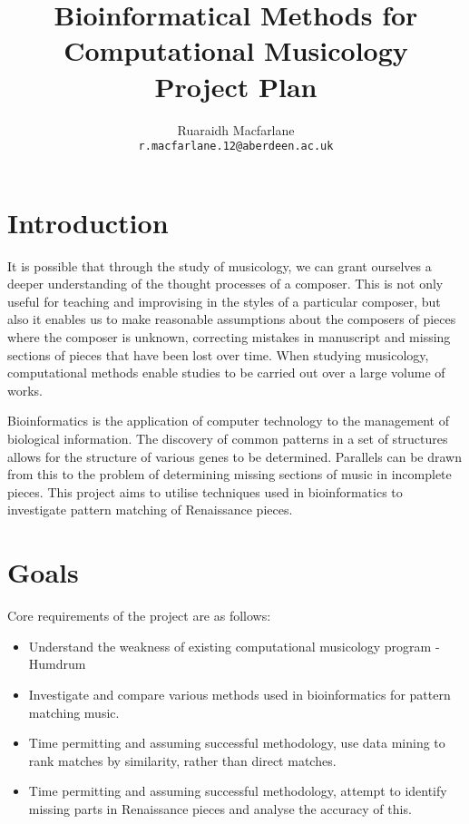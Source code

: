 \documentclass[a4paper,12pt]{article}
\begin{document}
\title{Bioinformatical Methods for Computational Musicology\\ Project Plan}
\author{Ruaraidh Macfarlane \\ \texttt{r.macfarlane.12@aberdeen.ac.uk}}
\maketitle

  \section{Introduction}
    It is possible that through the study of musicology, we can grant ourselves a deeper understanding of the thought processes of a composer. This is not only useful for teaching and improvising in the styles of a particular composer, but also it enables us to make reasonable assumptions about the composers of pieces where the composer is unknown, correcting mistakes in manuscript and missing sections of pieces that have been lost over time.  When studying musicology, computational methods enable studies to be carried out over a large volume of works.
  
    Bioinformatics is the application of computer technology to the management of biological information.  The discovery of common patterns in a set of structures allows for the structure of various genes to be determined. \cite{eidhammer2000structure} Parallels can be drawn from this to the problem of determining missing sections of music in incomplete pieces.  This project aims to utilise techniques used in bioinformatics to investigate pattern matching of Renaissance pieces.
  

  \section{Goals}
    Core requirements of the project are as follows:
    \begin{itemize}
      \item{Understand the weakness of existing computational musicology program - Humdrum \cite{humdrum}}
      \item{Investigate and compare various methods used in bioinformatics for pattern matching music.}
      \item{Time permitting and assuming successful methodology, use data mining to rank matches by similarity, rather than direct matches.}
      \item{Time permitting and assuming successful methodology, attempt to identify missing parts in Renaissance pieces and analyse the accuracy of this.}
    \end{itemize}
\end{document}
